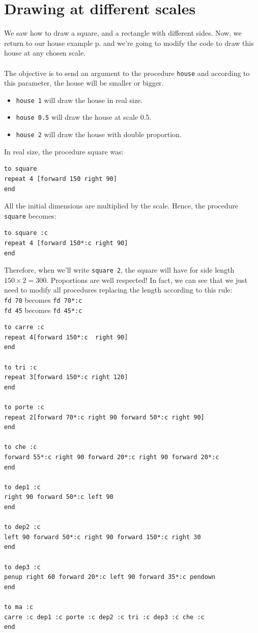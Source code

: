 \section{Drawing at different scales}
\noindent We saw how to draw a square, and a rectangle with different sides. Now, we return to our house example p. \pageref{maison} and we're going to modify the code to draw this house at any chosen scale.\\ \\
The objective is to send an argument to the procedure \texttt{house} and according to this parameter, the house will be smaller or bigger. 
\begin{itemize}
 \item \texttt{house 1} will draw the house in real size.
 \item \texttt{house 0.5} will draw the house at scale 0.5.
 \item \texttt{house 2} will draw the house with double proportion.
\end{itemize}
In real size, the procedure square was:
\begin{verbatim}
to square
repeat 4 [forward 150 right 90]
end
\end{verbatim}
All the initial dimensions are multiplied by the scale. Hence, the procedure \texttt{square} becomes: 
\begin{verbatim}
to square :c
repeat 4 [forward 150*:c right 90]
end
\end{verbatim}
Therefore, when we'll write \texttt{square 2}, the square will have for side length $150\times2=300$. Proportions are well respected! In fact, we can see that we just need to modify all procedures replacing the length according to this rule: \\
\texttt{fd 70} becomes \texttt{fd 70*:c} \\
\texttt{fd 45} becomes \texttt{fd 45*:c} \\  
\begin{verbatim}
to carre :c
repeat 4[forward 150*:c  right 90]
end

to tri :c
repeat 3[forward 150*:c right 120]
end

to porte :c
repeat 2[forward 70*:c right 90 forward 50*:c right 90]
end

to che :c
forward 55*:c right 90 forward 20*:c right 90 forward 20*:c
end

to dep1 :c
right 90 forward 50*:c left 90
end

to dep2 :c
left 90 forward 50*:c right 90 forward 150*:c right 30
end

to dep3 :c
penup right 60 forward 20*:c left 90 forward 35*:c pendown
end

to ma :c
carre :c dep1 :c porte :c dep2 :c tri :c dep3 :c che :c
end
\end{verbatim}
